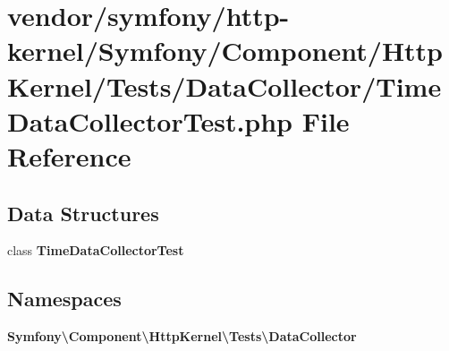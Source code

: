 \section{vendor/symfony/http-\/kernel/\+Symfony/\+Component/\+Http\+Kernel/\+Tests/\+Data\+Collector/\+Time\+Data\+Collector\+Test.php File Reference}
\label{_time_data_collector_test_8php}
\subsection*{Data Structures}
\begin{DoxyCompactItemize}
\item 
class {\bf Time\+Data\+Collector\+Test}
\end{DoxyCompactItemize}
\subsection*{Namespaces}
\begin{DoxyCompactItemize}
\item 
 {\bf Symfony\textbackslash{}\+Component\textbackslash{}\+Http\+Kernel\textbackslash{}\+Tests\textbackslash{}\+Data\+Collector}
\end{DoxyCompactItemize}
